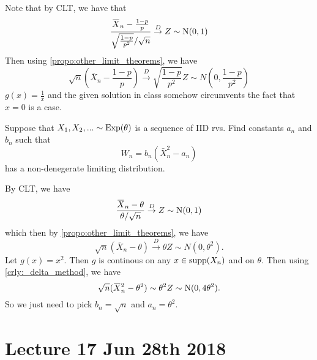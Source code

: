 \documentclass[notoc,notitlepage]{tufte-book}
\newcommand{\convd}{\overset{D}{\to}}
\begin{document}
\begin{solution}
  Note that by CLT, we have that
  \begin{equation*}
    \frac{\bar{X}_n - \frac{1 - p}{p}}{\sqrt{\frac{1 - p}{p^2}} / \sqrt{n}} \convd Z \sim \Nor(0, 1)
  \end{equation*}
  Then using \cref{propo:other_limit_theorems}, we have
  \begin{equation*}
    \sqrt{n} \left( \bar{X}_n - \frac{1 - p}{p} \right) \convd \sqrt{ \frac{1 - p}{p^2} } Z \sim N\left(0, \frac{1 - p}{p^2}\right)
  \end{equation*}
   $g(x) = \frac{1}{x}$ and the given solution in class somehow circumvents the fact that $x = 0$ is a case.
\end{solution}

\begin{eg}[Example 5.15]
  Suppose that $X_1, X_2,... \sim \operatorname{Exp}(\theta)$ is a sequence of IID rvs. Find constants $a_n$ and $b_n$ such that
  \begin{equation*}
    W_n = b_n (\bar{X}_n^2 - a_n)
  \end{equation*}
  has a non-denegerate limiting distribution.
\end{eg}

\begin{solution}
  By CLT, we have
  \begin{equation*}
    \frac{\bar{X}_n - \theta}{\theta / \sqrt{n}} \convd Z \sim \Nor(0, 1)
  \end{equation*}
  which then by \cref{propo:other_limit_theorems}, we have
  \begin{equation*}
    \sqrt{n} ( \bar{X}_n - \theta ) \convd \theta Z \sim N(0, \theta^2).
  \end{equation*}
  Let $g(x) = x^2$. Then $g$ is continous on any $x \in \operatorname{supp}(X_n)$ and on $\theta$. Then using \cref{crly:_delta_method}, we have
  \begin{equation*}
    \sqrt{n} ( \bar{X}_n^2 - \theta^2 ) \sim \theta^2 Z \sim \Nor(0, 4 \theta^2).
  \end{equation*}
  So we just need to pick $b_n = \sqrt{n}$ and $a_n = \theta^2$.
\end{solution}




\chapter{Lecture 17 Jun 28th 2018}%
\label{chp:lecture_17_jun_28th_2018}
\end{document}
